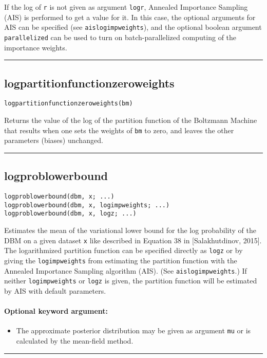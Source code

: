If the log of \texttt{r} is not given as argument \texttt{logr}, Annealed Importance Sampling (AIS) is performed to get a value for it. In this case, the optional arguments for AIS can be specified (see \texttt{aislogimpweights}), and the optional boolean argument \texttt{parallelized} can be used to turn on batch-parallelized computing of the importance weights.

\noindent\rule{\textwidth}{1pt}
\subsection*{logpartitionfunctionzeroweights}
\begin{verbatim}
logpartitionfunctionzeroweights(bm)
\end{verbatim}
Returns the value of the log of the partition function of the Boltzmann Machine that results when one sets the weights of \texttt{bm} to zero, and leaves the other parameters (biases) unchanged.

\noindent\rule{\textwidth}{1pt}
\subsection*{logproblowerbound}
\begin{verbatim}
logproblowerbound(dbm, x; ...)
logproblowerbound(dbm, x, logimpweights; ...)
logproblowerbound(dbm, x, logz; ...)
\end{verbatim}
Estimates the mean of the variational lower bound for the log probability of the DBM on a given dataset \texttt{x} like described in Equation 38 in [Salakhutdinov, 2015]. The logarithmized partition function can be specified directly as \texttt{logz} or by giving the \texttt{logimpweights} from estimating the partition function with the Annealed Importance Sampling algorithm (AIS). (See \texttt{aislogimpweights}.) If neither \texttt{logimpweights} or \texttt{logz} is given, the partition function will be estimated by AIS with default parameters.

\paragraph*{Optional keyword argument:}
\begin{itemize}
\item The approximate posterior distribution may be given as argument \texttt{mu} or is calculated by the mean-field method.

\end{itemize}
\noindent\rule{\textwidth}{1pt}

